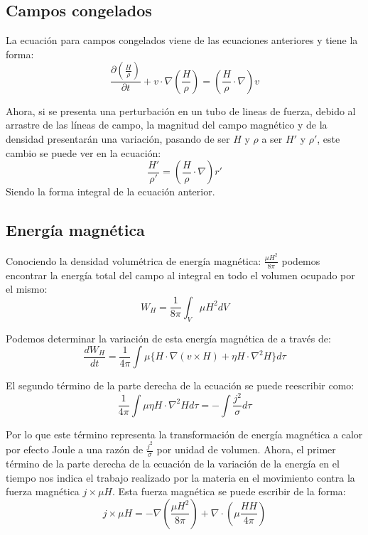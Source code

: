 \subsection{Campos congelados}
La ecuación para campos congelados viene de las ecuaciones anteriores y tiene la forma:
\begin{equation}
\frac{\partial\left( \frac{H}{\rho} \right)}{\partial t}+v\cdot \nabla \left( \frac{H}{\rho} \right)=\left( \frac{H}{\rho}\cdot \nabla \right)v
\end{equation}

Ahora, si se presenta una perturbación en un tubo de lineas de fuerza, debido al arrastre de las líneas de campo, la magnitud del campo magnético y de la densidad presentarán una variación, pasando de ser $H$ y $\rho$ a ser $H'$ y $\rho'$, este cambio se puede ver en la ecuación:
\begin{equation}
\frac{H'}{\rho'}=\left( \frac{H}{\rho} \cdot \nabla\right)r'
\end{equation}
Siendo la forma integral de la ecuación anterior.

\subsection{Energía magnética}
Conociendo la densidad volumétrica de energía magnética: $\frac{\mu H^{2}}{8\pi}$ podemos encontrar la energía total del campo al integral en todo el volumen ocupado por el mismo:
\begin{equation}
W_{H}=\frac{1}{8\pi}\int_{V} \mu H^{2}dV
\end{equation}

Podemos determinar la variación de esta energía magnética de a través de:
\begin{equation}
\frac{d W_{H}}{dt}=\frac{1}{4\pi }\int \mu\{H\cdot \nabla(v\times H)+\eta H\cdot \nabla ^{2}H\}d \tau
\end{equation}

El segundo término de la parte derecha de la ecuación se puede reescribir como:
\begin{equation}
\frac{1}{4\pi}\int \mu \eta H\cdot \nabla ^{2}Hd\tau=-\int \frac{j^{2}}{\sigma}d\tau
\end{equation}

Por lo que este término representa la transformación de energía magnética a calor por efecto Joule a una razón de $\frac{j^{2}}{\sigma}$ por unidad de volumen. Ahora, el primer término de la parte derecha de la ecuación de la variación de la energía en el tiempo nos indica el trabajo realizado por la materia en el movimiento contra la fuerza magnética $j\times \mu H$. Esta fuerza magnética se puede escribir de la forma:
\begin{equation}
j\times \mu H=-\nabla\left( \frac{\mu H^{2}}{8\pi} \right)+\nabla \cdot\left( \mu  \frac{HH}{4\pi} \right)
\end{equation}

